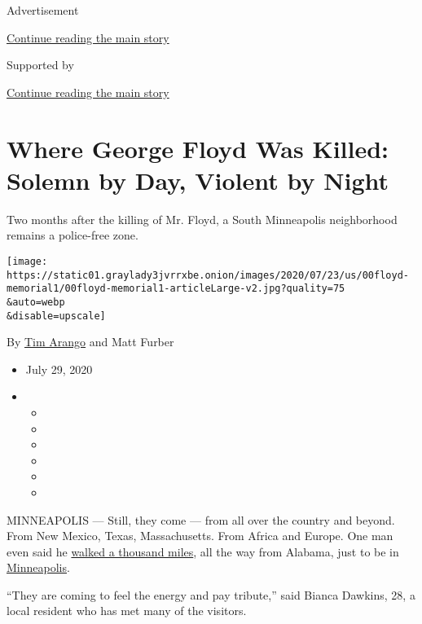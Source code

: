 Advertisement

\protect\hyperlink{after-top}{Continue reading the main story}

Supported by

\protect\hyperlink{after-sponsor}{Continue reading the main story}

\hypertarget{where-george-floyd-was-killed-solemn-by-day-violent-by-night}{%
\section{Where George Floyd Was Killed: Solemn by Day, Violent by
Night}\label{where-george-floyd-was-killed-solemn-by-day-violent-by-night}}

Two months after the killing of Mr. Floyd, a South Minneapolis
neighborhood remains a police-free zone.

\texttt{[image: https://static01.graylady3jvrrxbe.onion/images/2020/07/23/us/00floyd-memorial1/00floyd-memorial1-articleLarge-v2.jpg?quality=75\\\&auto=webp\\\&disable=upscale]}

By \href{https://www.nytimes3xbfgragh.onion/by/tim-arango}{Tim Arango}
and Matt Furber

\begin{itemize}
\item
  July 29, 2020
\item
  \begin{itemize}
  \item
  \item
  \item
  \item
  \item
  \item
  \end{itemize}
\end{itemize}

MINNEAPOLIS --- Still, they come --- from all over the country and
beyond. From New Mexico, Texas, Massachusetts. From Africa and Europe.
One man even said he
\href{https://www.npr.org/sections/live-updates-protests-for-racial-justice/2020/07/12/890261223/man-treks-1-000-miles-from-alabama-to-minnesota-for-change-justice-and-equality}{walked
a thousand miles}, all the way from Alabama, just to be in
\href{https://www.nytimes3xbfgragh.onion/2020/07/29/us/george-floyd-memorial.html}{Minneapolis}.

``They are coming to feel the energy and pay tribute,'' said Bianca
Dawkins, 28, a local resident who has met many of the visitors.

